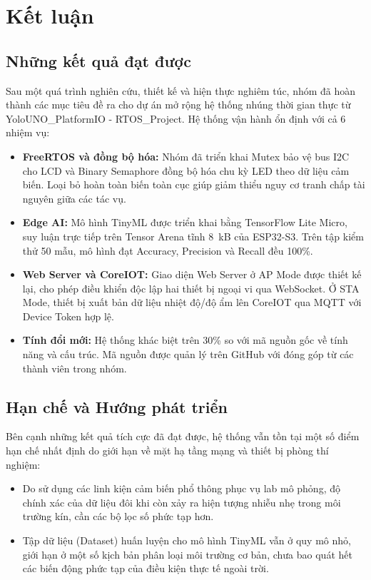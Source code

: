 \section{Kết luận}

\subsection{Những kết quả đạt được}
Sau một quá trình nghiên cứu, thiết kế và hiện thực nghiêm túc, nhóm đã hoàn thành các mục tiêu đề ra cho dự án mở rộng hệ thống nhúng thời gian thực từ YoloUNO\_PlatformIO - RTOS\_Project. Hệ thống vận hành ổn định với cả 6 nhiệm vụ:
\begin{itemize}
    \item \textbf{FreeRTOS và đồng bộ hóa:} Nhóm đã triển khai Mutex bảo vệ bus I2C cho LCD và Binary Semaphore đồng bộ hóa chu kỳ LED theo dữ liệu cảm biến. Loại bỏ hoàn toàn biến toàn cục giúp giảm thiểu nguy cơ tranh chấp tài nguyên giữa các tác vụ.
    \item \textbf{Edge AI:} Mô hình TinyML được triển khai bằng TensorFlow Lite Micro, suy luận trực tiếp trên Tensor Arena tĩnh 8~kB của ESP32-S3. Trên tập kiểm thử 50 mẫu, mô hình đạt Accuracy, Precision và Recall đều 100\%.
    \item \textbf{Web Server và CoreIOT:} Giao diện Web Server ở AP Mode được thiết kế lại, cho phép điều khiển độc lập hai thiết bị ngoại vi qua WebSocket. Ở STA Mode, thiết bị xuất bản dữ liệu nhiệt độ/độ ẩm lên CoreIOT qua MQTT với Device Token hợp lệ.
    \item \textbf{Tính đổi mới:} Hệ thống khác biệt trên 30\% so với mã nguồn gốc về tính năng và cấu trúc. Mã nguồn được quản lý trên GitHub với đóng góp từ các thành viên trong nhóm.
\end{itemize}

\subsection{Hạn chế và Hướng phát triển}
Bên cạnh những kết quả tích cực đã đạt được, hệ thống vẫn tồn tại một số điểm hạn chế nhất định do giới hạn về mặt hạ tầng mạng và thiết bị phòng thí nghiệm:
\begin{itemize}
    \item Do sử dụng các linh kiện cảm biến phổ thông phục vụ lab mô phỏng, độ chính xác của dữ liệu đôi khi còn xảy ra hiện tượng nhiễu nhẹ trong môi trường kín, cần các bộ lọc số phức tạp hơn.
    \item Tập dữ liệu (Dataset) huấn luyện cho mô hình TinyML vẫn ở quy mô nhỏ, giới hạn ở một số kịch bản phân loại môi trường cơ bản, chưa bao quát hết các biến động phức tạp của điều kiện thực tế ngoài trời.
\end{itemize}

